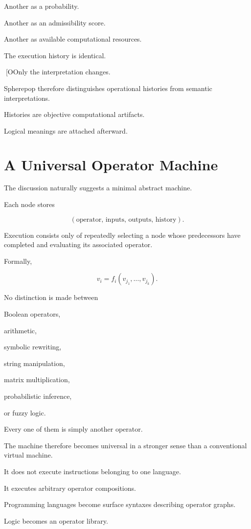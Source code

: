 \documentclass[12pt,oneside]{article}
\begin{document}
Another as a probability.

Another as an admissibility score.

Another as available computational resources.

The execution history is identical.

[OOnly the interpretation changes.

Spherepop therefore distinguishes operational histories from semantic interpretations.

Histories are objective computational artifacts.

Logical meanings are attached afterward.

\section{A Universal Operator Machine}

The discussion naturally suggests a minimal abstract machine.

Each node stores

\[
(\text{operator},\,
\text{inputs},\,
\text{outputs},\,
\text{history}).
\]

Execution consists only of repeatedly selecting a node whose predecessors have completed and evaluating its associated operator.

Formally,

\[
v_i
=
f_i(v_{j_1},\ldots,v_{j_k}).
\]

No distinction is made between

Boolean operators,

arithmetic,

symbolic rewriting,

string manipulation,

matrix multiplication,

probabilistic inference,

or fuzzy logic.

Every one of them is simply another operator.

The machine therefore becomes universal in a stronger sense than a conventional virtual machine.

It does not execute instructions belonging to one language.

It executes arbitrary operator compositions.

Programming languages become surface syntaxes describing operator graphs.

Logic becomes an operator library.
\end{document}
